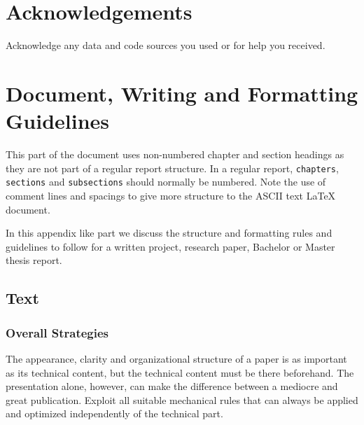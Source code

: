 \documentclass[11pt, a4paper,oneside,chapterprefix=false]{scrbook}
\begin{document}
\chapter{Acknowledgements} \label{chp:acknowledgements}

Acknowledge any data and code sources you used or for help you received.


\chapter*{Document, Writing and Formatting Guidelines}

This part of the document uses non-numbered chapter and section headings as they are not part of a regular report structure. In a regular report, \texttt{chapters}, \texttt{sections} and \texttt{subsections} should normally be numbered. Note the use of comment lines and spacings to give more structure to the ASCII text LaTeX document.

In this appendix like part we discuss the structure and formatting rules and guidelines to follow for a written project, research paper, Bachelor or Master thesis report.

\section*{Text} \label{sec:text}

\subsection*{Overall Strategies}

The appearance, clarity and organizational structure of a paper is as important as its technical content, but the technical content must be there beforehand. The presentation alone, however, can make the difference between a mediocre and great publication. Exploit all suitable mechanical rules that can always be applied and optimized independently of the technical part.
\end{document}
